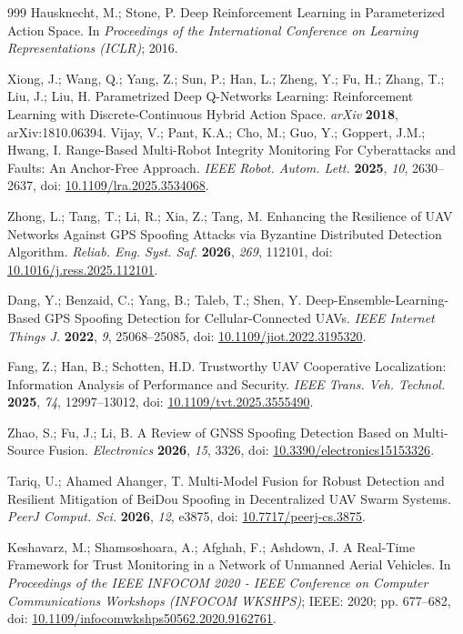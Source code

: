 \documentclass[notspecified,article,submit,moreauthors]{Definitions/mdpi}
\begin{document}
\begin{thebibliography}{999}
Hausknecht, M.; Stone, P. Deep Reinforcement Learning in Parameterized Action Space. In {\em Proceedings of the International Conference on Learning Representations (ICLR)}; 2016.

Xiong, J.; Wang, Q.; Yang, Z.; Sun, P.; Han, L.; Zheng, Y.; Fu, H.; Zhang, T.; Liu, J.; Liu, H. Parametrized Deep Q-Networks Learning: Reinforcement Learning with Discrete-Continuous Hybrid Action Space. {\em arXiv} {\bf 2018}, arXiv:1810.06394.
Vijay, V.; Pant, K.A.; Cho, M.; Guo, Y.; Goppert, J.M.; Hwang, I. Range-Based Multi-Robot Integrity Monitoring For Cyberattacks and Faults: An Anchor-Free Approach. {\em IEEE Robot. Autom. Lett.} {\bf 2025}, {\em 10}, 2630--2637, doi: \href{https://doi.org/10.1109/lra.2025.3534068}{10.1109/lra.2025.3534068}.

Zhong, L.; Tang, T.; Li, R.; Xia, Z.; Tang, M. Enhancing the Resilience of UAV Networks Against GPS Spoofing Attacks via Byzantine Distributed Detection Algorithm. {\em Reliab. Eng. Syst. Saf.} {\bf 2026}, {\em 269}, 112101, doi: \href{https://doi.org/10.1016/j.ress.2025.112101}{10.1016/j.ress.2025.112101}.

Dang, Y.; Benzaid, C.; Yang, B.; Taleb, T.; Shen, Y. Deep-Ensemble-Learning-Based GPS Spoofing Detection for Cellular-Connected UAVs. {\em IEEE Internet Things J.} {\bf 2022}, {\em 9}, 25068--25085, doi: \href{https://doi.org/10.1109/jiot.2022.3195320}{10.1109/jiot.2022.3195320}.

Fang, Z.; Han, B.; Schotten, H.D. Trustworthy UAV Cooperative Localization: Information Analysis of Performance and Security. {\em IEEE Trans. Veh. Technol.} {\bf 2025}, {\em 74}, 12997--13012, doi: \href{https://doi.org/10.1109/tvt.2025.3555490}{10.1109/tvt.2025.3555490}.

Zhao, S.; Fu, J.; Li, B. A Review of GNSS Spoofing Detection Based on Multi-Source Fusion. {\em Electronics} {\bf 2026}, {\em 15}, 3326, doi: \href{https://doi.org/10.3390/electronics15153326}{10.3390/electronics15153326}.

Tariq, U.; Ahamed Ahanger, T. Multi-Model Fusion for Robust Detection and Resilient Mitigation of BeiDou Spoofing in Decentralized UAV Swarm Systems. {\em PeerJ Comput. Sci.} {\bf 2026}, {\em 12}, e3875, doi: \href{https://doi.org/10.7717/peerj-cs.3875}{10.7717/peerj-cs.3875}.

Keshavarz, M.; Shamsoshoara, A.; Afghah, F.; Ashdown, J. A Real-Time Framework for Trust Monitoring in a Network of Unmanned Aerial Vehicles. In {\em Proceedings of the IEEE INFOCOM 2020 - IEEE Conference on Computer Communications Workshops (INFOCOM WKSHPS)}; IEEE: 2020; pp. 677--682, doi: \href{https://doi.org/10.1109/infocomwkshps50562.2020.9162761}{10.1109/infocomwkshps50562.2020.9162761}.

\end{thebibliography}
\end{document}
